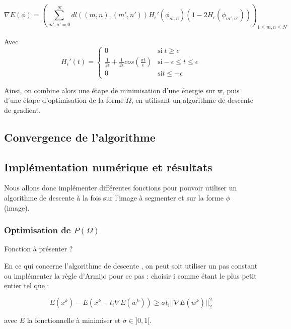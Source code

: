 \[ \nabla E (\phi) = ( \sum \limits_{m',n' = 0}^N dl((m,n),(m',n')) H_{\epsilon}' (\phi_{m,n}) ( 1 - 2H_{\epsilon}(\phi_{m',n'})) ) _{1 \leq m,n \leq N}  \] 

Avec 
\[ H_{\epsilon}' (t) = \left\{ \begin{matrix}
0 & \text{si} \; t \geq \epsilon \\
\frac{1}{2 \epsilon} + \frac{1}{2 \epsilon} cos(\frac{\pi t}{\epsilon}) & \text{si} -\epsilon \leq t \leq \epsilon \\
0 & \text{si} t \leq - \epsilon 
\end{matrix} \right. \] 

Ainsi, on combine alors une étape de minimisation d'une énergie sur w, puis d'une étape d'optimisation de la forme $\Omega$, en utilisant un algorithme de descente de gradient. 

\subsection{Convergence de l'algorithme}
\subsection{Implémentation numérique et résultats}

Nous allons donc implémenter différentes fonctions pour pouvoir utiliser un algorithme de descente à la fois sur l'image à segmenter et sur la forme $\phi$ (image).

\bigskip

\subsubsection{Optimisation de \texorpdfstring{$P(\Omega)$}{Lg}}

Fonction à présenter ? 

En ce qui concerne l'algorithme de descente , on peut soit utiliser un pas constant  ou implémenter la règle d'Armijo pour ce pas : choisir i comme étant le plus petit entier tel que : 

\[ E(x^k) - E(x^k - t_i \nabla E(w^k)) \geq \sigma t_i || \nabla E(w^k)||_2^2\] 

avec $E$ la fonctionnelle à minimiser et $\sigma \in ]0,1[$. 

